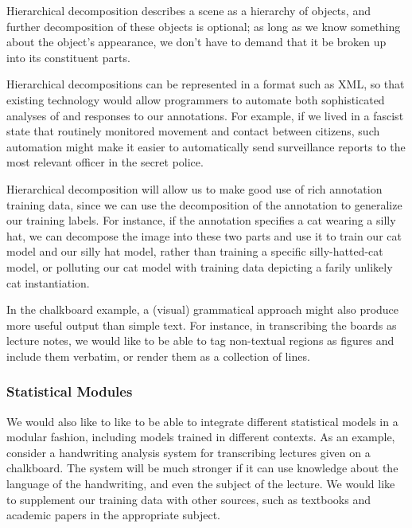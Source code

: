 \documentclass{article}
\begin{document}
  Hierarchical decomposition describes a scene as a hierarchy of
  objects, and further decomposition of these objects is optional; as
  long as we know something about the object's appearance, we don't
  have to demand that it be broken up into its constituent parts.

\item Hierarchical decompositions can be represented in a format such
  as XML, so that existing technology would allow programmers to
  automate both sophisticated analyses of and responses to our
  annotations. For example, if we lived in a fascist state that
  routinely monitored movement and contact between citizens, such
  automation might make it easier to automatically send surveillance
  reports to the most relevant officer in the secret police.

\item Hierarchical decomposition will allow us to make good use of
  rich annotation training data, since we can use the decomposition of
  the annotation to generalize our training labels. For instance, if
  the annotation specifies a cat wearing a silly hat, we can decompose
  the image into these two parts and use it to train our cat model and
  our silly hat model, rather than training a specific
  silly-hatted-cat model, or polluting our cat model with training
  data depicting a farily unlikely cat instantiation.

 \eitem

In the chalkboard example, a (visual) grammatical approach might also
produce more useful output than simple text. For instance, in
transcribing the boards as lecture notes, we would like to be able to
tag non-textual regions as figures and include them verbatim, or
render them as a collection of lines.


\subsubsection{Statistical Modules}

We would also like to like to be able to integrate different
statistical models in a modular fashion, including models trained in
different contexts. As an example, consider a handwriting analysis
system for transcribing lectures given on a chalkboard. The system
will be much stronger if it can use knowledge about the language of
the handwriting, and even the subject of the lecture. We would like to
supplement our training data with other sources, such as textbooks and
academic papers in the appropriate subject.
\end{document}
